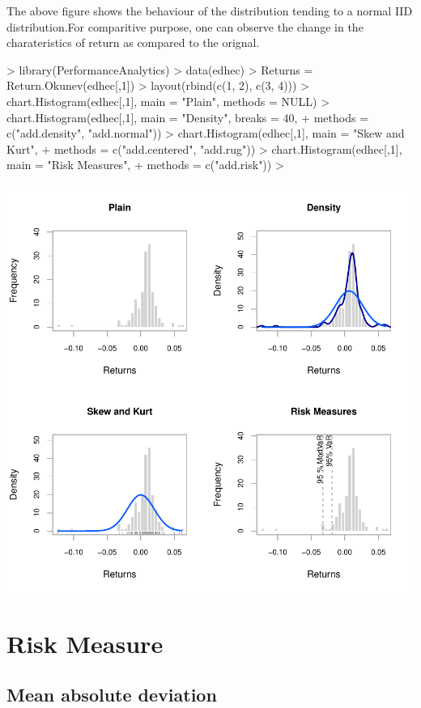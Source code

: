 \documentclass[12pt,letterpaper,english]{article}
\begin{document}
The above figure shows the behaviour of the distribution tending to a normal IID distribution.For comparitive purpose, one can observe the change in the charateristics of return as compared to the orignal.
\begin{Schunk}
\begin{Sinput}
> library(PerformanceAnalytics)
> data(edhec)
> Returns = Return.Okunev(edhec[,1])
> layout(rbind(c(1, 2), c(3, 4)))
>  chart.Histogram(edhec[,1], main = "Plain", methods = NULL)
>  chart.Histogram(edhec[,1], main = "Density", breaks = 40,
+  methods = c("add.density", "add.normal"))
>  chart.Histogram(edhec[,1], main = "Skew and Kurt",
+  methods = c("add.centered", "add.rug"))
> chart.Histogram(edhec[,1], main = "Risk Measures",
+  methods = c("add.risk"))
> 
\end{Sinput}
\end{Schunk}
\includegraphics{UnSmoothReturnAnalysis-008}

\section{Risk Measure}

\subsection{Mean absolute deviation}
\end{document}
